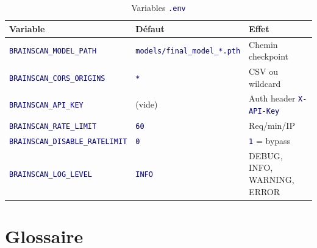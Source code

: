 \documentclass[11pt,a4paper,oneside]{report}
\newcommand{\code}[1]{\texttt{\textcolor{navy}{#1}}}
\begin{document}
\begin{table}[!htbp]
\centering
\caption{Variables \code{.env}}
\begin{tabular}{|l|l|l|}
\hline
\textbf{Variable} & \textbf{Défaut} & \textbf{Effet} \\
\hline
\code{BRAINSCAN\_MODEL\_PATH} & \code{models/final\_model\_*.pth} & Chemin checkpoint \\
\code{BRAINSCAN\_CORS\_ORIGINS} & \code{*} & CSV ou wildcard \\
\code{BRAINSCAN\_API\_KEY} & (vide) & Auth header \code{X-API-Key} \\
\code{BRAINSCAN\_RATE\_LIMIT} & \code{60} & Req/min/IP \\
\code{BRAINSCAN\_DISABLE\_RATELIMIT} & \code{0} & \code{1} = bypass \\
\code{BRAINSCAN\_LOG\_LEVEL} & \code{INFO} & DEBUG, INFO, WARNING, ERROR \\
\hline
\end{tabular}
\end{table}

\section{Glossaire}
\end{document}
